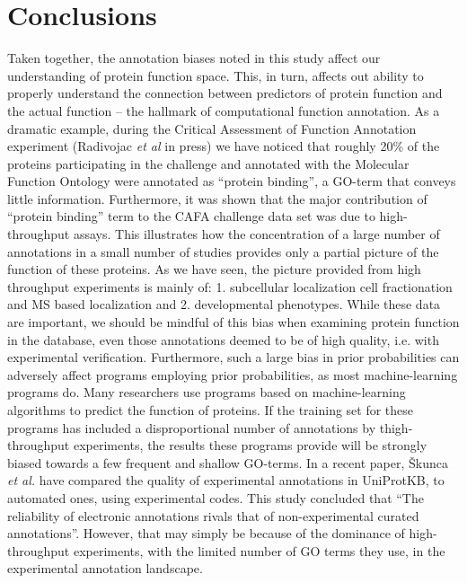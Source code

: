 \documentclass[12pt]{article}
\begin{document}
\section*{Conclusions}

Taken together, the annotation biases noted in this study affect our understanding of protein function
space. This, in turn, affects out ability to properly understand the connection between predictors of
protein function and the actual function -- the hallmark of computational function annotation. As a
dramatic example, during the Critical Assessment of Function Annotation experiment (Radivojac \textit{et
al} in press) we have noticed that roughly 20\% of the proteins participating in the challenge and
annotated with the Molecular Function Ontology were annotated as ``protein binding'', a GO-term that
conveys little information. Furthermore, it was shown that the major contribution of ``protein binding''
term to the CAFA challenge data set was due to high-throughput assays. This illustrates how the
concentration of a large number of annotations in a small number of studies provides only a partial
picture of the function of these proteins. As we have seen, the picture provided from high throughput
experiments is mainly of: 1. subcellular localization cell fractionation and MS based localization and 2.
developmental phenotypes. While these data are important, we should be mindful of this bias when
examining protein function in the database, even those annotations deemed to be of high quality, i.e.
with experimental verification. Furthermore, such a large bias in prior probabilities can adversely
affect programs employing prior probabilities, as most machine-learning programs do. Many researchers use
programs based on machine-learning algorithms to predict the function of proteins. If the training set
for these programs has included a disproportional number of annotations by thigh-throughput experiments,
the results these programs provide will be strongly biased towards a few frequent and shallow GO-terms.
In a recent paper, \v{S}kunca \textit{et al.} have compared the quality of experimental annotations in
UniProtKB, to automated ones, using experimental codes\cite{Skunca2012Quality}. This study concluded
that ``The reliability of electronic annotations rivals that of non-experimental curated
annotations''.
However, that may simply be because of the dominance of high-throughput experiments, with the limited
number of GO terms they use, in the experimental annotation landscape. 
\end{document}
